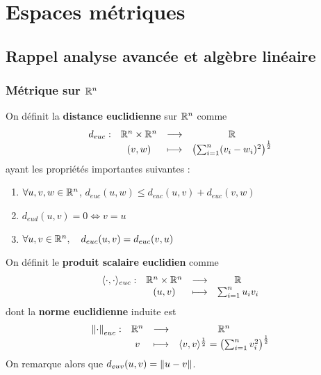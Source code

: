 \chapter{Espaces métriques}

\section{Rappel analyse avancée et algèbre linéaire}
\subsection{Métrique sur $\mathbb{R}^n$}
\begin{definition} \label{def: Distance euclidienne}
	On définit la \textbf{distance euclidienne} sur $\mathbb{R}^n$ comme
	\[
	\begin{array}{cccc}
		d_{euc} : & \mathbb{R}^n \times \mathbb{R}^n & \longrightarrow & \mathbb{R} \\
					& (v, w) & \longmapsto & \left( \sum_{i=1}^n (v_i - w_i)^2 \right)^\frac12
	\end{array}
	\]
	ayant les propriétés importantes suivantes :
	\begin{enumerate}
		\item $\forall u,v,w \in \mathbb{R}^n$, $d_{euc}(u,w) \leqslant d_{euc}(u,v) + d_{euc}(v,w)$
		
		\item $d_{eud}(u,v) = 0 \iff v = u$
		
		\item $\forall u,v \in \mathbb{R}^n, \quad d_{euc}(u,v) = d_{euc}(v,u)$
	\end{enumerate}
\end{definition}

\begin{definition} \label{def: Produit scalaire et norme euclidienne}
	On définit le \textbf{produit scalaire euclidien} comme
	\[
	\begin{array}{cccc}
		\langle \cdot, \cdot \rangle_{euc} : & \mathbb{R}^n \times \mathbb{R}^n& \longrightarrow & \mathbb{R} \\
												& (u,v) & \longmapsto & \sum_{i=1}^n u_i v_i 
	\end{array}
	\]
	dont la \textbf{norme euclidienne} induite est
	\[
	\begin{array}{cccc}
		\left\| \cdot \right\|_{euc} : & \mathbb{R}^n & \longrightarrow & \mathbb{R}^n \\
								& v & \longmapsto & \langle v,v \rangle^\frac12 = \left(\sum_{i=1}^n v_i^2 \right)^\frac12
	\end{array}
	\]
	On remarque alors que $d_{euv}(u,v) = \left\| u -v \right\|$.
\end{definition}


